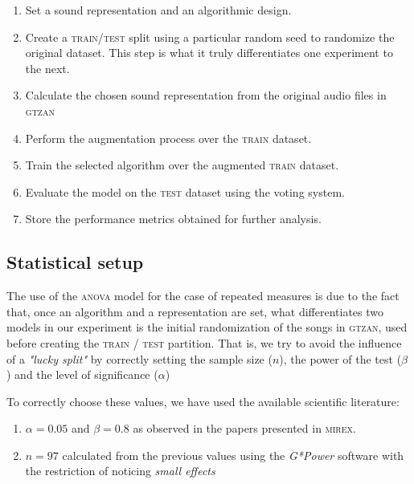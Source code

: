 \begin{enumerate}
  \item {
    Set a sound representation and an algorithmic design.
  }
  \item {
    Create a \textsc{train/test} split using a particular random seed to randomize the original dataset. This step is what it truly differentiates one experiment to the next.
  }
  \item {
    Calculate the chosen sound representation from the original audio files in \textsc{gtzan}
  }
  \item {
    Perform the augmentation process over the \textsc{train} dataset.
  }
  \item {
    Train the selected algorithm over the augmented \textsc{train} dataset.
  }
  \item {
    Evaluate the model on the \textsc{test} dataset using the voting system.
  }
  \item {
    Store the performance metrics obtained for further analysis.
  }
\end{enumerate}

\subsection{Statistical setup}

The use of the \textsc{anova} model for the case of repeated measures is due to the fact that, once an algorithm and a representation are set, what differentiates two models in our experiment is the initial randomization of the songs in \textsc{gtzan}, used before creating the \textsc{train / test} partition. That is, we try to avoid the influence of a {\it "lucky split"} by correctly setting the sample size ($n$), the power of the test ($\beta$) and the level of significance ($\alpha$)

To correctly choose these values, we have used the available scientific literature:

\begin{enumerate}
  \item {
    $\alpha = 0.05$ and $\beta = 0.8$ as observed in the papers presented in \textsc{mirex}. \citep{37}
  }
  \item {
    $n = 97$ calculated from the previous values ​​using the {\it G*Power} \citep{36, 42} software with the restriction of noticing {\it small effects}
  }
\end{enumerate}

